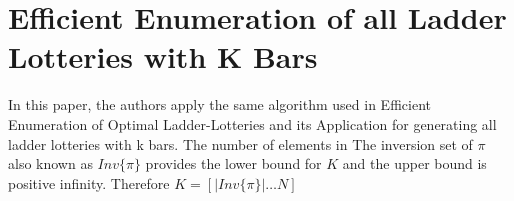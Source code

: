 \section{Efficient Enumeration of all Ladder Lotteries with K Bars}

In this paper, the authors apply the same algorithm used in Efficient Enumeration of Optimal Ladder-Lotteries 
and its Application for generating all ladder lotteries with k bars. The number of elements 
in The inversion set of $\pi$ also known as $Inv\{\pi\}$ provides the lower bound for $K$ 
and the upper bound is positive infinity. Therefore $K=[|Inv\{\pi\}| \dots N]$\par